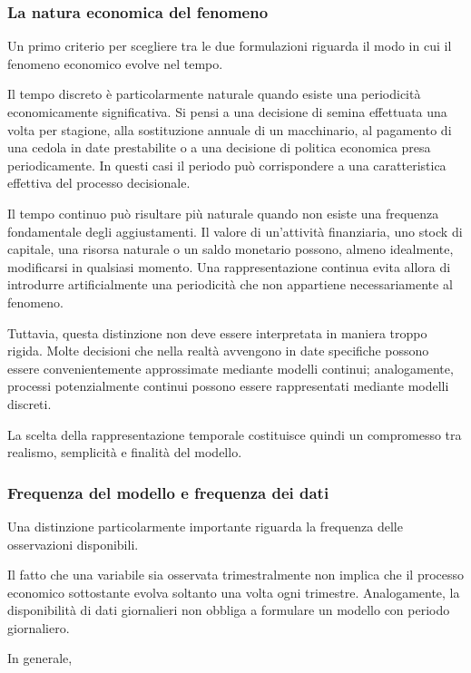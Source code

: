 \documentclass{book}
\begin{document}
\subsubsection{La natura economica del fenomeno}

Un primo criterio per scegliere tra le due formulazioni riguarda il modo in cui il fenomeno economico evolve nel tempo.

Il tempo discreto è particolarmente naturale quando esiste una periodicità economicamente significativa. Si pensi a una decisione di semina effettuata una volta per stagione, alla sostituzione annuale di un macchinario, al pagamento di una cedola in date prestabilite o a una decisione di politica economica presa periodicamente. In questi casi il periodo può corrispondere a una caratteristica effettiva del processo decisionale.

Il tempo continuo può risultare più naturale quando non esiste una frequenza fondamentale degli aggiustamenti. Il valore di un'attività finanziaria, uno stock di capitale, una risorsa naturale o un saldo monetario possono, almeno idealmente, modificarsi in qualsiasi momento. Una rappresentazione continua evita allora di introdurre artificialmente una periodicità che non appartiene necessariamente al fenomeno.

Tuttavia, questa distinzione non deve essere interpretata in maniera troppo rigida. Molte decisioni che nella realtà avvengono in date specifiche possono essere convenientemente approssimate mediante modelli continui; analogamente, processi potenzialmente continui possono essere rappresentati mediante modelli discreti.

La scelta della rappresentazione temporale costituisce quindi un compromesso tra realismo, semplicità e finalità del modello.

\subsubsection{Frequenza del modello e frequenza dei dati}

Una distinzione particolarmente importante riguarda la frequenza delle osservazioni disponibili.

Il fatto che una variabile sia osservata trimestralmente non implica che il processo economico sottostante evolva soltanto una volta ogni trimestre. Analogamente, la disponibilità di dati giornalieri non obbliga a formulare un modello con periodo giornaliero.

In generale,
\end{document}
